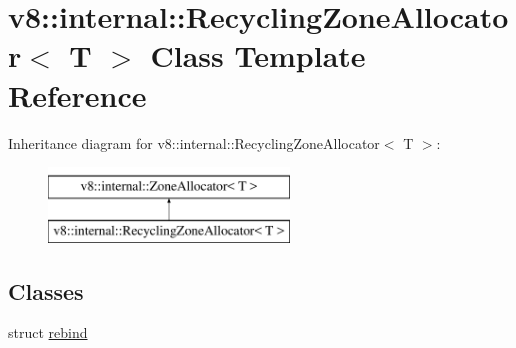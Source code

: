 \hypertarget{classv8_1_1internal_1_1RecyclingZoneAllocator}{}\section{v8\+:\+:internal\+:\+:Recycling\+Zone\+Allocator$<$ T $>$ Class Template Reference}
\label{classv8_1_1internal_1_1RecyclingZoneAllocator}
Inheritance diagram for v8\+:\+:internal\+:\+:Recycling\+Zone\+Allocator$<$ T $>$\+:\begin{figure}[H]
\begin{center}
\leavevmode
\includegraphics[height=2.000000cm]{classv8_1_1internal_1_1RecyclingZoneAllocator}
\end{center}
\end{figure}
\subsection*{Classes}
\begin{DoxyCompactItemize}
\item 
struct \mbox{\hyperlink{structv8_1_1internal_1_1RecyclingZoneAllocator_1_1rebind}{rebind}}
\end{DoxyCompactItemize}
